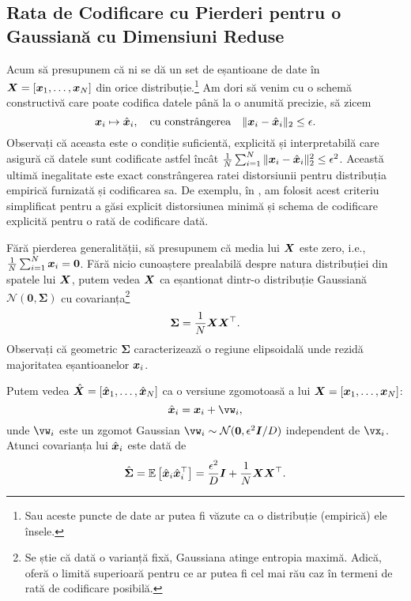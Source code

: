 \documentclass[../../book-main_ro.tex]{subfiles}
\begin{document}
\subsection{Rata de Codificare cu Pierderi pentru o Gaussiană cu Dimensiuni Reduse}\label{subsec:lossy DR}
Acum să presupunem că ni se dă un set de eșantioane de date în $\bm{X} = [\bm{x}_1, \ldots, \bm{x}_N]$ din orice distribuție.\footnote{Sau aceste puncte de date ar putea fi văzute ca o distribuție (empirică) ele însele.} Am dori să venim cu o schemă constructivă care poate codifica datele până la o anumită precizie, să zicem
\begin{equation}
	\bm{x}_i \mapsto \hat {\bm{x}}_i, \quad \mbox{cu constrângerea} \quad \|\bm{x}_i - \hat {\bm{x}}_i\|_2 \le \epsilon.
\end{equation}
Observați că aceasta este o condiție suficientă, explicită și interpretabilă care asigură că datele sunt codificate astfel încât \(\frac{1}{N}\sum_{i = 1}^{N} \norm{\x_i- \hat \x_i}_2^{2} \le \epsilon^{2}\). Această ultimă inegalitate este exact constrângerea ratei distorsiunii pentru distribuția empirică furnizată și codificarea sa. De exemplu, în , am folosit acest criteriu simplificat pentru a găsi explicit distorsiunea minimă și schema de codificare explicită pentru o rată de codificare dată.

Fără pierderea generalității, să presupunem că media lui $\bm{X}$ este zero, i.e., $\frac{1}{N} \sum_{i = 1}^{N} \bm{x}_i = \boldsymbol{0}$. Fără nicio cunoaștere prealabilă despre natura distribuției din spatele lui $\bm{X}$, putem vedea $\bm{X}$ ca eșantionat dintr-o distribuție Gaussiană $\mathcal{N}(\boldsymbol{0}, {\boldsymbol{\Sigma}})$ cu covarianța\footnote{Se știe că dată o varianță fixă, Gaussiana atinge entropia maximă. Adică, oferă o limită superioară pentru ce ar putea fi cel mai rău caz în termeni de rată de codificare posibilă.}
\begin{equation}
	{\boldsymbol{\Sigma}} = \frac{1}{N} \bm{X}\bm{X}^\top.
\end{equation}
Observați că geometric ${\boldsymbol{\Sigma}}$ caracterizează o regiune elipsoidală unde rezidă majoritatea eșantioanelor $\bm{x}_i$.

Putem vedea $\hat {\bm{X}} = [\hat {\bm{x}}_1,\ldots, \hat {\bm{x}}_N]$ ca o versiune zgomotoasă a lui $\bm{X} = [\bm{x}_1, \ldots, \bm{x}_N]$:
\begin{equation}
	\hat \x_i = \x_i + \vw_i,
\end{equation}
unde $\vw_i$ este un zgomot Gaussian $\vw_i  \sim \mathcal{N}(\boldsymbol{0} , {\epsilon^2}  \boldsymbol{I}/{D})$ independent de $\vx_i$. Atunci covarianța lui $\hat {\bm{x}}_i$ este dată de
\begin{equation}
	\hat{\boldsymbol{\Sigma}} = \mathbb{E}\left[\hat {\bm{x}}_i \hat {\bm{x}}_i^\top\right] = \frac{\epsilon^2}{D} \boldsymbol{I} + \frac{1}{N} \bm{X}\bm{X}^\top.
\end{equation}
\end{document}
